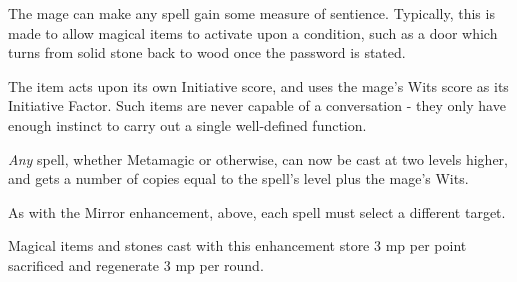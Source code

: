 \begin{multicols}{2}
The mage can make any spell gain some measure of sentience.
Typically, this is made to allow magical items to activate upon a condition, such as a door which turns from solid stone back to wood once the password is stated.

The item acts upon its own Initiative score, and uses the mage's Wits score as its Initiative Factor.
Such items are never capable of a conversation - they only have enough instinct to carry out a single well-defined function.


\emph{Any} spell, whether Metamagic or otherwise, can now be cast at two levels higher, and gets a number of copies equal to the spell's level plus the mage's Wits.

As with the Mirror enhancement, above, each spell must select a different target.

\spelllevel


Magical items and stones cast with this enhancement store 3 \gls{mp} per point sacrificed and regenerate 3 \gls{mp} per round.

\end{multicols}


